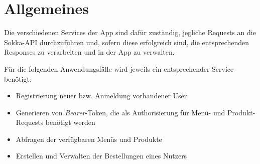\section{Allgemeines}

Die verschiedenen Services der App sind dafür zuständig, jegliche Requests an die Sokka-API
durchzuführen und, sofern diese erfolgreich sind, die entsprechenden Responses zu verarbeiten 
und in der App zu verwalten.

Für die folgenden Anwendungsfälle wird jeweils ein entsprechender Service benötigt:

\begin{itemize}
    \item Registrierung neuer bzw. Anmeldung vorhandener User
    \item Generieren von \textit{Bearer}-Token, die als Authorisierung
        für Menü- und Produkt-Requests benötigt werden
    \item Abfragen der verfügbaren Menüs und Produkte
    \item Erstellen und Verwalten der Bestellungen eines Nutzers
\end{itemize}